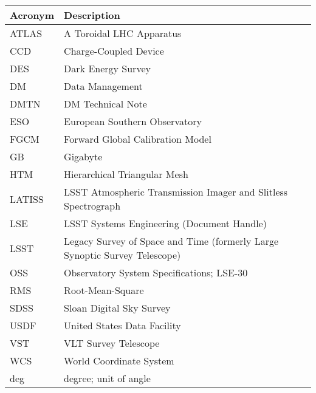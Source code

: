 \addtocounter{table}{-1}
\begin{longtable}{p{}p{}}\hline
\textbf{Acronym} & \textbf{Description}  \\\hline

ATLAS & A Toroidal LHC Apparatus \\\hline
CCD & Charge-Coupled Device \\\hline
DES & Dark Energy Survey \\\hline
DM & Data Management \\\hline
DMTN & DM Technical Note \\\hline
ESO & European Southern Observatory \\\hline
FGCM & Forward Global Calibration Model \\\hline
GB & Gigabyte \\\hline
HTM & Hierarchical Triangular Mesh \\\hline
LATISS & LSST Atmospheric Transmission Imager and Slitless Spectrograph \\\hline
LSE & LSST Systems Engineering (Document Handle) \\\hline
LSST & Legacy Survey of Space and Time (formerly Large Synoptic Survey Telescope) \\\hline
OSS & Observatory System Specifications; LSE-30 \\\hline
RMS & Root-Mean-Square \\\hline
SDSS & Sloan Digital Sky Survey \\\hline
USDF & United States Data Facility \\\hline
VST & VLT Survey Telescope \\\hline
WCS & World Coordinate System \\\hline
deg & degree; unit of angle \\\hline
\end{longtable}
